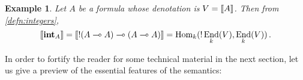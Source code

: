 \documentclass[english,letter paper,12pt,reqno]{article}
\theoremstyle{example}
\newtheorem{example}[theorem]{Example}
\newtheorem{remark}[theorem]{Remark}
\def\Hom{\operatorname{Hom}}
\DeclareMathOperator{\End}{End}
\def\inta{\bold{int}}
\begin{document}



\begin{example}\label{example:denotation_2}  Let $A$ be a formula whose denotation is $V = \llbracket A \rrbracket$. Then from \eqref{defn:integers},
\[
\den{\inta_A} = \den{ {!}( A \multimap A) \multimap (A \multimap A)} = \Hom_k( {!} \End_k(V), \End_k(V) )\,.
\]
\end{example}

In order to fortify the reader for some technical material in the next section, let us give a preview of the essential features of the semantics:
\end{document}
